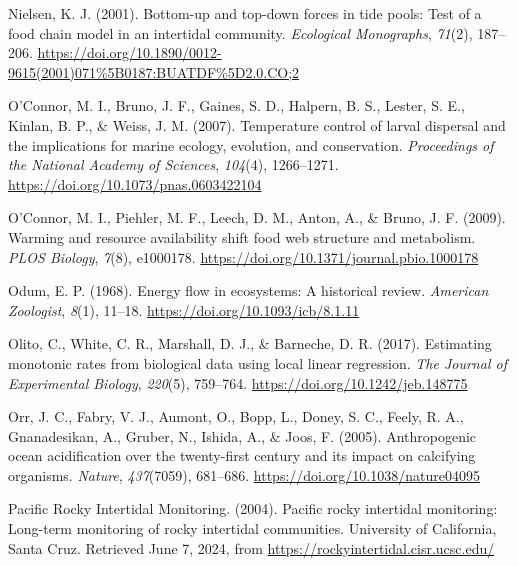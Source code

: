 \documentclass{CSUNthesis}
\begin{document}
Nielsen, K. J. (2001). Bottom-up and top-down forces in tide pools: Test of a food chain model in an intertidal community. \textit{Ecological Monographs}, \textit{71}(2), 187--206. \url{https://doi.org/10.1890/0012-9615(2001)071\%5B0187:BUATDF\%5D2.0.CO;2}

\vspace{0.1em}

O'Connor, M. I., Bruno, J. F., Gaines, S. D., Halpern, B. S., Lester, S. E., Kinlan, B. P., \& Weiss, J. M. (2007). Temperature control of larval dispersal and the implications for marine ecology, evolution, and conservation. \textit{Proceedings of the National Academy of Sciences}, \textit{104}(4), 1266--1271. \url{https://doi.org/10.1073/pnas.0603422104}

\vspace{0.1em}

O'Connor, M. I., Piehler, M. F., Leech, D. M., Anton, A., \& Bruno, J. F. (2009). Warming and resource availability shift food web structure and metabolism. \textit{PLOS Biology}, \textit{7}(8), e1000178. \url{https://doi.org/10.1371/journal.pbio.1000178}

\vspace{0.1em}

Odum, E. P. (1968). Energy flow in ecosystems: A historical review. \textit{American Zoologist}, \textit{8}(1), 11--18. \url{https://doi.org/10.1093/icb/8.1.11}

\vspace{0.1em}

Olito, C., White, C. R., Marshall, D. J., \& Barneche, D. R. (2017). Estimating monotonic rates from biological data using local linear regression. \textit{The Journal of Experimental Biology}, \textit{220}(5), 759--764. \url{https://doi.org/10.1242/jeb.148775}

\vspace{0.1em}

Orr, J. C., Fabry, V. J., Aumont, O., Bopp, L., Doney, S. C., Feely, R. A., Gnanadesikan, A., Gruber, N., Ishida, A., \& Joos, F. (2005). Anthropogenic ocean acidification over the twenty-first century and its impact on calcifying organisms. \textit{Nature}, \textit{437}(7059), 681--686. \url{https://doi.org/10.1038/nature04095}

\vspace{0.1em}

\vspace{0.1em}

Pacific Rocky Intertidal Monitoring. (2004). Pacific rocky intertidal monitoring: Long-term monitoring of rocky intertidal communities. University of California, Santa Cruz. Retrieved June 7, 2024, from \url{https://rockyintertidal.cisr.ucsc.edu/}
\end{document}
